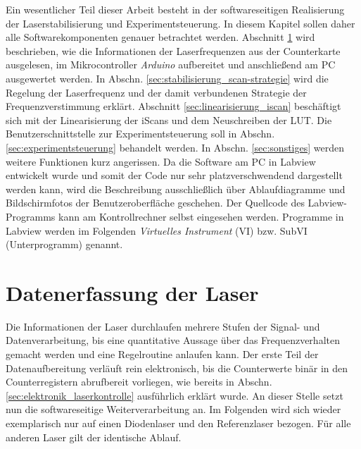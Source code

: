 Ein wesentlicher Teil dieser Arbeit besteht in der softwareseitigen Realisierung
der Laserstabilisierung und Experimentsteuerung. In diesem Kapitel sollen daher
alle Softwarekomponenten genauer betrachtet werden. Abschnitt
\ref{sec:datenerfassung_der_laser} wird beschrieben, wie die Informationen
der Laserfrequenzen aus der Counterkarte ausgelesen, im
Mikrocontroller \textit{Arduino} aufbereitet und anschließend am PC ausgewertet
werden. In Abschn. \ref{sec:stabilisierung_scan-strategie} wird die Regelung
der Laserfrequenz und der damit verbundenen Strategie der Frequenzverstimmung
erklärt. Abschnitt \ref{sec:linearisierung_iscan} beschäftigt sich mit der
Linearisierung der iScans und dem Neuschreiben der LUT. Die
Benutzerschnittstelle zur Experimentsteuerung soll in Abschn.
\ref{sec:experimentsteuerung} behandelt werden. In Abschn. \ref{sec:sonstiges}
werden weitere Funktionen kurz angerissen. Da die Software am PC in
Labview entwickelt wurde und somit der Code nur sehr platzverschwendend
dargestellt werden kann, wird die Beschreibung ausschließlich über
Ablaufdiagramme und Bildschirmfotos der Benutzeroberfläche geschehen. Der
Quellcode des Labview-Programms kann am Kontrollrechner selbst eingesehen
werden. Programme in Labview werden im Folgenden \textit{Virtuelles
Instrument} (VI) bzw. SubVI (Unterprogramm) genannt.

\section{Datenerfassung der Laser}\label{sec:datenerfassung_der_laser}
Die Informationen der Laser durchlaufen mehrere Stufen der Signal- und
Datenverarbeitung, bis eine quantitative Aussage über das Frequenzverhalten
gemacht werden und eine Regelroutine anlaufen kann. Der erste Teil der
Datenaufbereitung verläuft rein elektronisch, bis die Counterwerte binär in
den Counterregistern abrufbereit vorliegen, wie bereits in Abschn.
\ref{sec:elektronik_laserkontrolle} ausführlich erklärt wurde. An dieser Stelle
setzt nun die softwareseitige Weiterverarbeitung an. Im Folgenden wird sich
wieder exemplarisch nur auf einen Diodenlaser und den Referenzlaser bezogen.
Für alle anderen Laser gilt der identische Ablauf.

